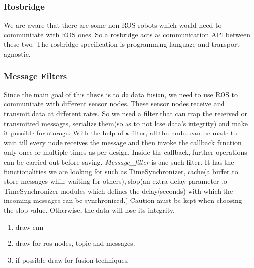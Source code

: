 \subsubsection*{Rosbridge}
We are aware that there are some non-ROS robots which would need to communicate with ROS
ones. So a rosbridge \cite{rosbridge} acts as communication API between these two. The rosbridge
specification is programming language and transport agnostic.

\subsubsection*{Message Filters}
Since the main goal of this thesis is to do data fusion, we need to use ROS to communicate
with different sensor nodes. These sensor nodes receive and transmit data at different rates.
So we need a filter that can trap the received or transmitted messages, serialize them(so
as to not lose data's integrity) and make it possible for storage. With the help of a
filter, all the nodes can be made to wait till every node receives the message and then
invoke the callback function only once or multiple times as per design. Inside the callback, further operations can be
carried out before saving. \textit{Message\_filter} \cite{messagefilters} is one such filter. It has the
functionalities we are looking for such as TimeSynchronizer, cache(a buffer to store
messages while waiting for others), slop(an extra delay parameter to TimeSynchronizer
modules which defines the delay(seconds) with which the incoming messages can be
synchronized.) Caution must be kept when choosing the slop value. Otherwise, the data will
lose its integrity.

\begin{enumerate}
    \item draw cnn
    \item draw for ros nodes, topic and messages.
    \item if possible draw for fusion techniques.
\end{enumerate}




